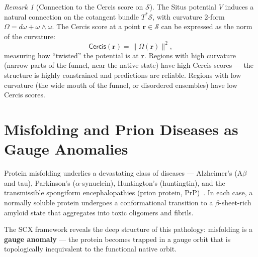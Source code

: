 \documentclass[12pt,a4paper]{article}
\theoremstyle{remark}
\newtheorem{remark}[theorem]{Remark}
\newcommand{\Sstruct}{\mathcal{S}}
\newcommand{\Cercis}{\textsf{Cercis}}
\begin{document}
\begin{remark}[Connection to the Cercis score on $\Sstruct$]
The Situs potential $V$ induces a natural connection on the cotangent bundle $T^*\Sstruct$, with curvature 2-form $\Omega = d\omega + \omega \wedge \omega$.
The Cercis score at a point $\mathbf{r} \in \Sstruct$ can be expressed as the norm of the curvature:
\begin{equation}
    \Cercis(\mathbf{r}) = \|\Omega(\mathbf{r})\|^2,
\end{equation}
measuring how ``twisted'' the potential is at $\mathbf{r}$.
Regions with high curvature (narrow parts of the funnel, near the native state) have high Cercis scores — the structure is highly constrained and predictions are reliable.
Regions with low curvature (the wide mouth of the funnel, or disordered ensembles) have low Cercis scores.
\end{remark}

\section{Misfolding and Prion Diseases as Gauge Anomalies}
\label{sec:misfolding}

Protein misfolding underlies a devastating class of diseases — Alzheimer's (A$\beta$ and tau), Parkinson's ($\alpha$-synuclein), Huntington's (huntingtin), and the transmissible spongiform encephalopathies (prion protein, PrP)~\cite{chiti2017protein, knowles2014amyloid, dobson2017protein}.
In each case, a normally soluble protein undergoes a conformational transition to a $\beta$-sheet-rich amyloid state that aggregates into toxic oligomers and fibrils.

The SCX framework reveals the deep structure of this pathology: misfolding is a \textbf{gauge anomaly} — the protein becomes trapped in a gauge orbit that is topologically inequivalent to the functional native orbit.
\end{document}
